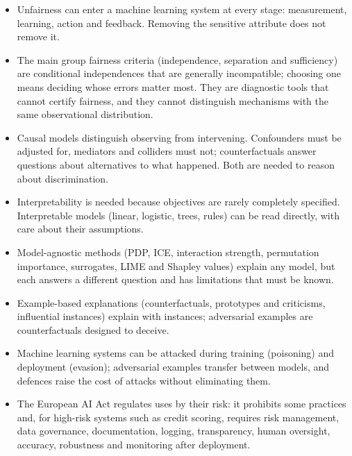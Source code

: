 \begin{itemize}
  \item Unfairness can enter a machine learning system at every stage: measurement, learning, action and
        feedback. Removing the sensitive attribute does not remove it.
  \item The main group fairness criteria (independence, separation and sufficiency) are conditional
        independences that are generally incompatible; choosing one means deciding whose errors matter most. They
        are diagnostic tools that cannot certify fairness, and they cannot distinguish mechanisms with the same
        observational distribution.
  \item Causal models distinguish observing from intervening. Confounders must be adjusted for, mediators
        and colliders must not; counterfactuals answer questions about alternatives to what happened. Both
        are needed to reason about discrimination.
  \item Interpretability is needed because objectives are rarely completely specified. Interpretable models
        (linear, logistic, trees, rules) can be read directly, with care about their assumptions.
  \item Model-agnostic methods (PDP, ICE, interaction strength, permutation importance, surrogates, LIME and
        Shapley values) explain any model, but each answers a different question and has limitations that
        must be known.
  \item Example-based explanations (counterfactuals, prototypes and criticisms, influential instances)
        explain with instances; adversarial examples are counterfactuals designed to deceive.
  \item Machine learning systems can be attacked during training (poisoning) and deployment (evasion);
        adversarial examples transfer between models, and defences raise the cost of attacks without
        eliminating them.
  \item The European AI Act regulates uses by their risk: it prohibits some practices and, for high-risk systems such as
        credit scoring, requires risk management, data governance, documentation, logging, transparency, human oversight,
        accuracy, robustness and monitoring after deployment.
\end{itemize}

